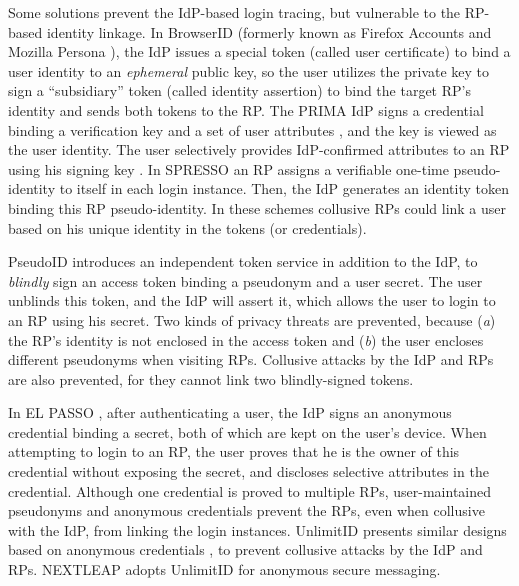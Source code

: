 Some solutions prevent the IdP-based login tracing,
    but vulnerable to the RP-based identity linkage.
In BrowserID \cite{BrowserID} (formerly known as Firefox Accounts \cite{FirefoxAccount} and Mozilla Persona \cite{persona}),
 the IdP %
  issues a special token (called user certificate) to bind a user identity to an \emph{ephemeral} public key,
 so the user utilizes the private key to sign a ``subsidiary'' token (called identity assertion)
    to bind the target RP's identity and sends both tokens to the RP.
The PRIMA IdP signs a credential binding a verification key and a set of user attributes \cite{prima}, and the key is viewed as the user identity.
The user selectively provides IdP-confirmed attributes to an RP using his signing key \cite{Oblivion}. %
In SPRESSO \cite{SPRESSO} an RP assigns a verifiable one-time pseudo-identity to itself in each login instance.
Then, the IdP generates an identity token binding this RP pseudo-identity. %
In these schemes \cite{BrowserID,prima,SPRESSO}
    collusive RPs could link a user based on his unique identity in the tokens (or credentials).

PseudoID \cite{PseudoID} introduces an independent token service in addition to the IdP,
    to  \emph{blindly} sign an access token binding a pseudonym and a user secret.
The user unblinds this token,
 and the IdP will assert it,
    which allows the user to login to an RP using his secret.
Two kinds of privacy threats are prevented, because (\emph{a}) the RP's identity is not enclosed in the access token
    and (\emph{b}) the user encloses different pseudonyms when visiting RPs.
Collusive attacks by the IdP and RPs are also prevented,
    for they cannot link two blindly-signed tokens.




In EL PASSO \cite{ELPASSO}, after authenticating a user,
    the IdP signs an anonymous credential \cite{anon-credential} binding a secret,
         both of which are kept on the user's device.
When attempting to login to an RP,
    the user proves that he is the owner of this credential without exposing the secret,
        and discloses selective attributes in the credential.
Although one credential is proved to multiple RPs,
        user-maintained pseudonyms and anonymous credentials prevent the RPs, even when collusive with the IdP, from linking the login instances.
UnlimitID \cite{UnlimitID} presents similar designs based on anonymous credentials \cite{anon-credential},
        to prevent collusive attacks by the IdP and RPs.
NEXTLEAP \cite{nextleap} adopts UnlimitID for anonymous secure messaging.

